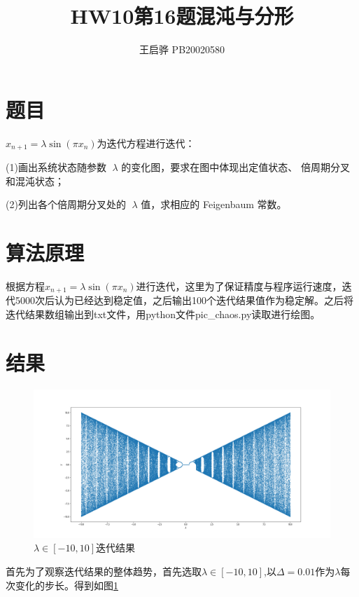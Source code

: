 \documentclass{article}
\title{\songti \zihao{2}\bfseries HW10第16题混沌与分形}
\author{王启骅 PB20020580}
\begin{document}
	\maketitle
	\section{题目}
$ x_{n+1}=\lambda\sin(\pi x_n) $为迭代方程进行迭代：


(1)画出系统状态随参数 $\lambda$ 的变化图，要求在图中体现出定值状态、
倍周期分叉和混沌状态；


(2)列出各个倍周期分叉处的 $\lambda$ 值，求相应的 Feigenbaum 常数。
	\section{算法原理}
根据方程$ x_{n+1}=\lambda\sin(\pi x_n) $进行迭代，这里为了保证精度与程序运行速度，迭代5000次后认为已经达到稳定值，之后输出100个迭代结果值作为稳定解。之后将迭代结果数组输出到txt文件，用python文件pic\_chaos.py读取进行绘图。


	\section{结果}
		\begin{figure}[!h]
		
		\centering
		\includegraphics[scale=0.35]{result1}
		\caption{\heiti{}$\lambda\in[-10,10]$迭代结果}
		\label{fig:1}
	\end{figure}
首先为了观察迭代结果的整体趋势，首先选取$ \lambda\in[-10,10] $,以$ \Delta=0.01 $作为$ \lambda $每次变化的步长。得到如图\ref{fig:1}
\end{document}
